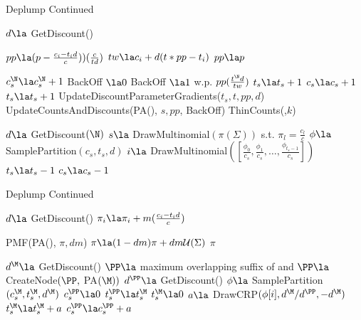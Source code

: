 \begin{algorithm}
	\begin{algorithmic}[1]
	\caption{Deplump Continued}
	
		\State $d \la $ GetDiscount(\N)

			\State $pp \la (p - \frac{c_i - t_i d}{c}))(\frac{c}{t d})$
			\State $tw \la c_i	+ d(t *pp - t_i)$	
		\Else
			\State $pp \la p$
		\EndIf
		
			\State $c^\N_s \la c^\N_s + 1$
			\State BackOff $\la 0$
			\State BackOff $\la 1$ w.p. $pp (\frac{t^\N d}{tw})$ 
				\State $t_s \la t_s + 1$
			 \EndIf
		\Else
				\State $c_s \la c_s + 1$
				\State $t_s \la t_s + 1$
			\EndIf
		\EndIf
		\State UpdateDiscountParameterGradients($t_s, t,pp, d$)
		\State UpdateCountsAndDiscounts(PA(\N), $s,pp$, BackOff)
		\State ThinCounts(\N,$k$)
	\EndFunction
		

	
		\State $d \la$ GetDiscount$(\N)$
			\State $s \la $ DrawMultinomial$(\pi(\Sigma))$ s.t. $\pi_l = \frac{c_l}{c}$
			\State $\phi \la$ SamplePartition$(c_s, t_s, d)$
			\State $i \la$ DrawMultinomial$([\frac{\phi_0}{c_s}, \frac{\phi_1}{c_s}, \ldots, \frac{\phi_{t_s -1}}{c_s} ])$
				\State $t_s \la t_s - 1$
			\EndIf
			\State $c_s \la c_s - 1$
		\EndWhile
	\EndFunction	

	
	\end{algorithmic}	
\end{algorithm}

\begin{algorithm}
	\begin{algorithmic}[1]
	\caption{Deplump Continued}

		\State $d \la $ GetDiscount(\N)		
				\State $\pi_i \la \pi_i + m(\frac{c_i - t_i d}{c})$
			\EndFor
		\EndIf
		
			\State \Return PMF(PA(\N), $\pi, d m$)
		\Else
			\State $\pi \la (1- d m)\pi + dm\mathcal{U}(\Sigma)$ 
			\State \Return $\pi$
		\EndIf 
	\EndFunction
	
		\State $d^\M \la$ GetDiscount(\M)
		\State $\PP \la$ maximum overlapping suffix  of \M \space and \Seq
		\State $\PP \la $ CreateNode$(\PP,$ PA$(\M))$
		\State $d^\PP \la$ GetDiscount(\PP)
			\State $\phi \la$ SamplePartition $(c^\M_s, t^\M_s,d^\M)$
			\State $c^\PP_s \la 0$
			\State $t^\PP_s \la t^\M_s$
			\State $t^\M_s \la 0$
				\State $a \la$ DrawCRP$(\phi[i],d^\M / d^\PP,-d^\M)$
				\State $t_s^\M \la t_s^\M + a$
				\State $c^\PP_s \la c^\PP_s + a$
			\EndFor
		\EndFor
		\State \Return \PP
	\EndFunction
	
		\end{algorithmic}	
\end{algorithm}

